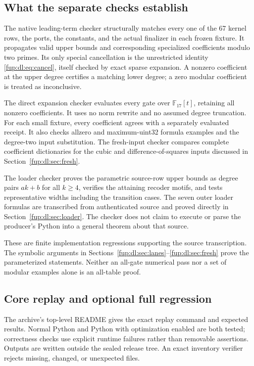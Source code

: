\documentclass[11pt,letterpaper]{article}
\theoremstyle{definition}\newtheorem{definition}[theorem]{Definition}
\theoremstyle{remark}\newtheorem{remark}[theorem]{Remark}
\begin{document}
\subsection{What the separate checks establish}
The native leading-term checker structurally matches every one of the 67 kernel rows, the ports, the constants, and the actual finalizer in each frozen fixture. It propagates valid upper bounds and corresponding specialized coefficients modulo two primes. Its only special cancellation is the unrestricted identity \eqref{fup:dl:eq:cancel}, itself checked by exact sparse expansion. A nonzero coefficient at the upper degree certifies a matching lower degree; a zero modular coefficient is treated as inconclusive.

The direct expansion checker evaluates every gate over $\mathbb F_{17}[t]$, retaining all nonzero coefficients. It uses no norm rewrite and no assumed degree truncation. For each small fixture, every coefficient agrees with a separately evaluated receipt. It also checks allzero and maximum-uint32 formula examples and the degree-two input substitution. The fresh-input checker compares complete coefficient dictionaries for the cubic and difference-of-squares inputs discussed in Section~\ref{fup:dl:sec:fresh}.

The loader checker proves the parametric source-row upper bounds as degree pairs $ak+b$ for all $k\ge4$, verifies the attaining recoder motifs, and tests representative widths including the transition cases. The seven outer loader formulas are transcribed from authenticated source and proved directly in Section~\ref{fup:dl:sec:loader}. The checker does not claim to execute or parse the producer's Python into a general theorem about that source.

These are finite implementation regressions supporting the source transcription. The symbolic arguments in Sections~\ref{fup:dl:sec:lanes}--\ref{fup:dl:sec:fresh} prove the parameterized statements. Neither an all-gate numerical pass nor a set of modular examples alone is an all-table proof.

\subsection{Core replay and optional full regression}
The archive's top-level README gives the exact replay command and expected results. Normal Python and Python with optimization enabled are both tested; correctness checks use explicit runtime failures rather than removable assertions. Outputs are written outside the sealed release tree. An exact inventory verifier rejects missing, changed, or unexpected files.
\end{document}
